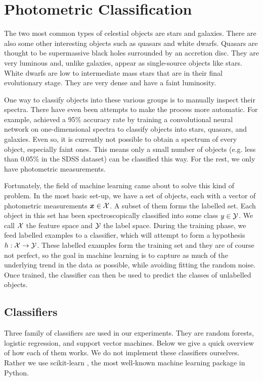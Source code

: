 

\chapter{Photometric Classification}
\label{cha:ml}

The two most common types of celestial objects are stars and galaxies. There are also some other
interesting objects such as quasars and white dwarfs. Quasars are thought to be supermassive black 
holes surrounded by an accretion disc. They are very luminous and, unlike galaxies, appear as
single-source objects like stars.
White dwarfs are low to intermediate mass stars that are in their final evolutionary stage.
They are very dense and have a faint luminosity.

One way to classify objects into 
these various groups is to manually inspect their spectra.
There have even been attempts to make the process
more automatic. For example,  achieved a 95\% accuracy rate by training
a convolutional neural network on one-dimensional spectra to classify objects
into stars, quasars, and galaxies. Even so, it is currently not possible to obtain
a spectrum of every object, especially faint ones. This means only a small number of objects
(e.g. less than 0.05\% in the SDSS dataset) can be classified this way. For the rest,
we only have photometric measurements.

Fortunately, the field of machine learning came about to solve this kind of problem.
In the most basic set-up, we have a set of objects, each with a vector of photometric measurements
$\bm{x} \in \mathcal{X}$. A subset of them forms the labelled set. Each object in this set
has been spectroscopically classified into some class $y \in \mathcal{Y}$.
We call $\mathcal{X}$ the feature space and $\mathcal{Y}$ the label space.
During the training phase, we feed labelled examples to a classifier,
which will attempt to form a hypothesis $h: \mathcal{X} \rightarrow \mathcal{Y}$. These labelled examples form
the training set and they are of course not perfect, so
the goal in machine learning is to capture as much of the underlying trend in the data as possible,
while avoiding fitting the random noise. Once trained, the classifier can then
be used to predict the classes of unlabelled objects.

\section{Classifiers}
\label{sec:machine}
Three family of classifiers are used in our experiments. They are random forests,
logistic regression, and support vector machines. Below we give a quick overview of how
each of them works. We do not implement these classifiers ourselves. Rather we use
scikit-learn \cite{pedregosa11}, the most well-known machine learning package
in Python. 

